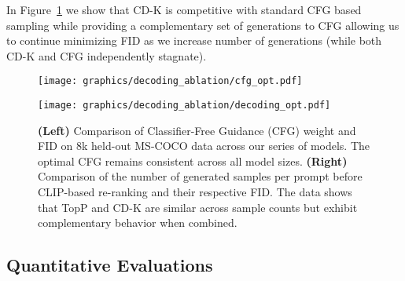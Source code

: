 \documentclass{article}
\begin{document}
In Figure~\ref{fig:cfg_dec_strat} we show that CD-K is competitive with standard CFG based sampling while providing a complementary set of generations to CFG allowing us to continue minimizing FID as we increase number of generations (while both CD-K and CFG independently stagnate).
\begin{figure}[htbp]
  \centering
  \begin{minipage}[b]{0.49\textwidth}
    \centering
    \texttt{[image: graphics/decoding\_ablation/cfg\_opt.pdf]}
  \end{minipage}
  \hfill
  \begin{minipage}[b]{0.49\textwidth}
    \centering
    \texttt{[image: graphics/decoding\_ablation/decoding\_opt.pdf]}
  \end{minipage}
  \caption{ \textbf{(Left)} Comparison of Classifier-Free Guidance (CFG) weight and FID on 8k held-out MS-COCO data across our series of models. The optimal CFG remains consistent across all model sizes. \textbf{(Right)} Comparison of the number of generated samples per prompt before CLIP-based re-ranking and their respective FID. The data shows that TopP and CD-K are similar across sample counts but exhibit complementary behavior when combined.}\label{fig:cfg_dec_strat}
\end{figure}

\subsection{Quantitative Evaluations}
\end{document}
